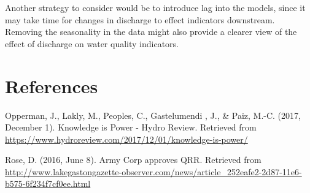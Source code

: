 \documentclass[12pt,]{article}
\begin{document}
Another strategy to consider would be to introduce lag into the models,
since it may take time for changes in discharge to effect indicators
downstream. Removing the seasonality in the data might also provide a
clearer view of the effect of discharge on water quality indicators.

\newpage

\hypertarget{references}{%
\section{References}\label{references}}

Opperman, J., Lakly, M., Peoples, C., Gastelumendi , J., \& Paiz, M.-C.
(2017, December 1). Knowledge is Power - Hydro Review. Retrieved from
\url{https://www.hydroreview.com/2017/12/01/knowledge-is-power/}

Rose, D. (2016, June 8). Army Corp approves QRR. Retrieved from
\url{http://www.lakegastongazette-observer.com/news/article_252eafe2-2d87-11e6-b575-6f234f7cf0ee.html}
\end{document}
